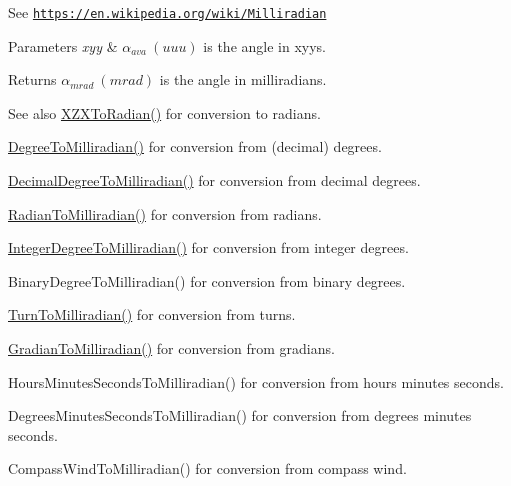 See \href{https://en.wikipedia.org/wiki/Milliradian}{\tt https\+://en.\+wikipedia.\+org/wiki/\+Milliradian} 
\begin{DoxyParams}{Parameters}
{\em xyy} & $\alpha_{ava}\ (uuu)$ is the angle in xyys. \\
\hline
\end{DoxyParams}
\begin{DoxyReturn}{Returns}
$\alpha_{mrad}\ (mrad)$ is the angle in milliradians. 
\end{DoxyReturn}
\begin{DoxySeeAlso}{See also}
\mbox{\hyperlink{group___e_g_x_math-_angle_conversions-_x_z_x_gad7d309239e80a848c661919f71fc22bd}{X\+Z\+X\+To\+Radian()}} for conversion to radians. 

\mbox{\hyperlink{group___e_g_x_math-_angle_conversions-_degree_gae4fa6c2d3805430760783650cfbfdb11}{Degree\+To\+Milliradian()}} for conversion from (decimal) degrees. 

\mbox{\hyperlink{group___e_g_x_math-_angle_conversions-_decimal_degree_gab567d02d4692d9642a4ad219e479713a}{Decimal\+Degree\+To\+Milliradian()}} for conversion from decimal degrees. 

\mbox{\hyperlink{group___e_g_x_math-_angle_conversions-_radian_gaea391f0cca39b05e298dd1cae162e7f1}{Radian\+To\+Milliradian()}} for conversion from radians. 

\mbox{\hyperlink{group___e_g_x_math-_angle_conversions-_integer_degree_ga5379a68bdff5cc4fab5bb1ba06ef9453}{Integer\+Degree\+To\+Milliradian()}} for conversion from integer degrees. 

Binary\+Degree\+To\+Milliradian() for conversion from binary degrees. 

\mbox{\hyperlink{group___e_g_x_math-_angle_conversions-_turn_ga2aea2621472294ce4c25ac7e55db51c6}{Turn\+To\+Milliradian()}} for conversion from turns. 

\mbox{\hyperlink{group___e_g_x_math-_angle_conversions-_gradian_ga144f1019dc760268a163d81fcb3ce482}{Gradian\+To\+Milliradian()}} for conversion from gradians. 

Hours\+Minutes\+Seconds\+To\+Milliradian() for conversion from hours minutes seconds. 

Degrees\+Minutes\+Seconds\+To\+Milliradian() for conversion from degrees minutes seconds. 

Compass\+Wind\+To\+Milliradian() for conversion from compass wind. 
\end{DoxySeeAlso}
\mbox{\label{group___e_g_x_math-_angle_conversions-_x_z_x_gad7d309239e80a848c661919f71fc22bd}} 

